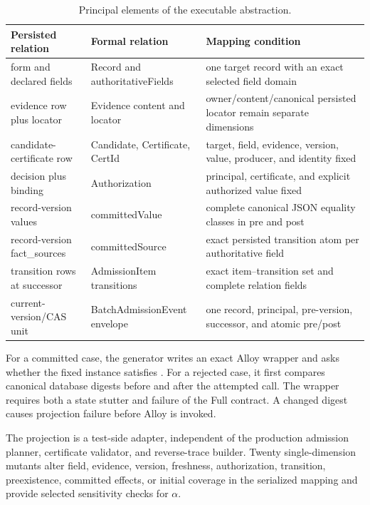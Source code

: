 \begin{table}[t]
\centering
\caption{Principal elements of the executable abstraction.}
\label{tab:abstraction}
\begin{tabularx}{\textwidth}{@{}>{\raggedright\arraybackslash}p{}>{\raggedright\arraybackslash}p{}>{\raggedright\arraybackslash}X@{}}
\toprule
Persisted relation & Formal relation & Mapping condition \\
\midrule
form and declared fields & Record and authoritativeFields & one target record with an exact selected field domain \\
evidence row plus locator & Evidence content and locator & owner/content/canonical persisted locator remain separate dimensions \\
candidate-certificate row & Candidate, Certificate, CertId & target, field, evidence, version, value, producer, and identity fixed \\
decision plus binding & Authorization & principal, certificate, and explicit authorized value fixed \\
record-version values & committedValue & complete canonical JSON equality classes in pre and post \\
record-version fact\_sources & committedSource & exact persisted transition atom per authoritative field \\
transition rows at successor & AdmissionItem transitions & exact item--transition set and complete relation fields \\
current-version/CAS unit & BatchAdmissionEvent envelope & one record, principal, pre-version, successor, and atomic pre/post \\
\bottomrule
\end{tabularx}
\end{table}

For a committed case, the generator writes an exact Alloy wrapper and asks whether the fixed instance satisfies . For a rejected case, it first compares canonical database digests before and after the attempted call. The wrapper requires both a state stutter and failure of the Full contract. A changed digest causes projection failure before Alloy is invoked.

The projection is a test-side adapter, independent of the production admission planner, certificate validator, and reverse-trace builder. Twenty single-dimension mutants alter field, evidence, version, freshness, authorization, transition, preexistence, committed effects, or initial coverage in the serialized mapping and provide selected sensitivity checks for $\alpha$.

